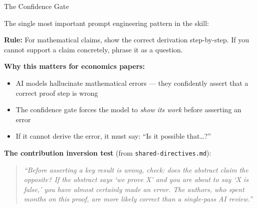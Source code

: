 \documentclass[10pt,english,aspectratio=169]{beamer}
\begin{document}
\begin{frame}{The Confidence Gate}

The single most important prompt engineering pattern in the skill:

\vspace{0.3cm}
\begin{tcolorbox}[colback=blue!3, colframe=RedTitle!60]
\textbf{Rule:} For mathematical claims, show the correct derivation step-by-step. If you cannot support a claim concretely, phrase it as a question.
\end{tcolorbox}

\vspace{0.3cm}
\textbf{Why this matters for economics papers:}
\begin{itemize}
    \item AI models hallucinate mathematical errors --- they confidently assert that a correct proof step is wrong
    \item The confidence gate forces the model to \emph{show its work} before asserting an error
    \item If it cannot derive the error, it must say: ``Is it possible that\ldots?''
\end{itemize}

\vspace{0.3cm}
\textbf{The contribution inversion test} (from \texttt{shared-directives.md}):
\begin{quote}
{\footnotesize\itshape ``Before asserting a key result is wrong, check: does the abstract claim the opposite? If the abstract says `we prove X' and you are about to say `X is false,' you have almost certainly made an error. The authors, who spent months on this proof, are more likely correct than a single-pass AI review.''}
\end{quote}

\end{frame}
\end{document}
